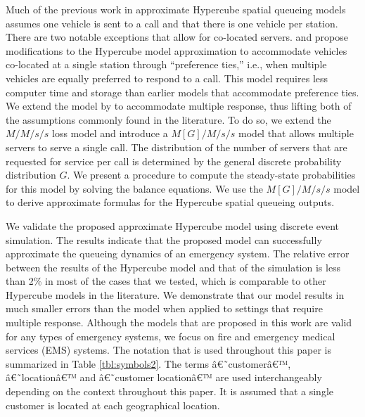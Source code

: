 \documentclass[11pt]{article}\topmargin 0mm
\begin{document}




Much of the previous work in approximate Hypercube spatial
queueing models assumes one vehicle is sent to a call and that
there is one vehicle per station. There are two notable exceptions
that allow for co-located servers.
{\color{blue}
\citet{burwell1993modeling} and \citet{Budge-etal-09} propose modifications to the Hypercube model approximation to accommodate vehicles co-located at a single station through
``preference ties,'' i.e., when multiple vehicles are equally
preferred to respond to a call. This model requires less
computer time and storage than earlier models that accommodate
preference ties.
}
We extend the model by \citet{Budge-etal-09} to
accommodate multiple response, thus lifting both of the
assumptions commonly found in the literature. To do so, we
extend the $M/M/s/s$ loss model and introduce a $M[G]/M/s/s$
model that allows multiple servers to serve a single call. The
distribution of the number of servers that are requested for
service per call is determined by the general discrete
probability distribution $G$. We present a procedure to compute
the steady-state probabilities for this model by 
solving the balance equations. We use the $M[G]/M/s/s$ model to
derive approximate formulas for the Hypercube spatial queueing
outputs.

We validate the proposed approximate Hypercube model using
discrete event simulation. The results indicate that the
proposed model can successfully approximate the queueing
dynamics of an emergency system. The relative error between the
results of the Hypercube model and that of the simulation is
less than 2\% in most of the cases that we tested, which is
comparable to other Hypercube models in the literature.
We demonstrate that our model results in much smaller errors than the \citet{Budge-etal-09} model when applied to settings that require multiple response. Although the models that are proposed in this work are valid
for any types of emergency systems, we focus on fire and
emergency medical services (EMS) systems. {\color{blue} The notation that is used throughout this paper is summarized in Table \ref{tbl:symbols2}. The terms â€˜customerâ€™, â€˜locationâ€™ and â€˜customer locationâ€™ are used interchangeably depending on the context throughout this paper. It is assumed that a single customer is located at each geographical location.}
\end{document}
